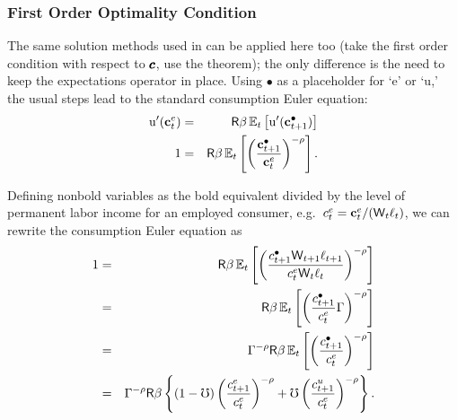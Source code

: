 \documentclass{handout}
\begin{document}
\subsubsection{First Order Optimality Condition}

The same solution methods used in  can 
be applied here too (take the first order condition with respect to $\pmb{c}$, use
the  theorem); the only difference is the need to keep the expectations operator
in place.  Using $\bullet$ as a placeholder for `e' or `u,' the
usual steps lead to the standard consumption Euler equation:
\begin{eqnarray}
        {\ensuremath{\mathrm{u}}}^{\prime}(\mathbf{c}^{e}_{t}) & = & \mathsf{R}\beta \operatorname{\mathbb{E}}_{t}\left[{\mathrm{u}}^{\prime}(\mathbf{c}^{\bullet}_{t+1}) \right]
\\  1         & = & \mathsf{R}\beta \operatorname{\mathbb{E}}_{t}\left[\left(\frac{\mathbf{c}^{\bullet}_{t+1}}{\mathbf{c}^{e}_{t}}\right)^{-\rho} \right]
.
\end{eqnarray}

Defining nonbold variables as the bold equivalent divided
by the level of permanent labor income for an employed consumer, e.g.\ $c^{e}_{t}=\mathbf{c}^{e}_{t}/(\mathsf{W}_{t}\ell_{t})$, we can rewrite the
consumption Euler equation as
\begin{eqnarray}
  1         & = & \mathsf{R}\beta \operatorname{\mathbb{E}}_{t}\left[\left(\frac{{c}^{\bullet}_{t+1}\mathsf{W}_{t+1}\ell_{t+1}}{c^{e}_{t}\mathsf{W}_{t}\ell_{t}}\right)^{-\rho} \right]  \label{eq:ceuler}
\\          & = & \mathsf{R}\beta \operatorname{\mathbb{E}}_{t}\left[\left(\frac{{c}^{\bullet}_{t+1}}{c^{e}_{t}}\Gamma\right)^{-\rho} \right]
\\          & = & \Gamma^{-\rho}\mathsf{R}\beta \operatorname{\mathbb{E}}_{t}\left[\left(\frac{{c}^{\bullet}_{t+1}}{c^{e}_{t}}\right)^{-\rho} \right] \label{eq:cEulerRaw}
\\          & = & \Gamma^{-\rho}\mathsf{R}\beta \left\{(1-\mho)\left(\frac{c^{e}_{t+1}}{c^{e}_{t}}\right)^{-\rho}+\mho \left(\frac{c^{u}_{t+1}}{c^{e}_{t}}\right)^{-\rho}\right\} \label{eq:Explicit}.
\end{eqnarray}
\end{document}
